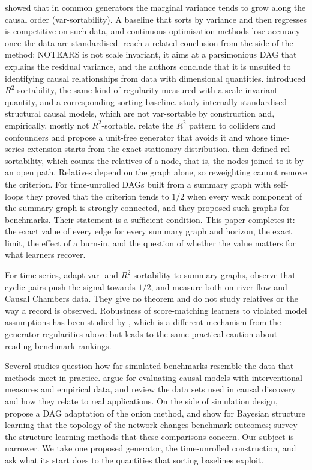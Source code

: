 \documentclass[pdflatex,sn-apa]{sn-jnl}
\theoremstyle{thmstyleone}
\theoremstyle{thmstylethree}
\theoremstyle{thmstyletwo}
\begin{document}
\citet{reisach2021beware} showed that in common generators the marginal
variance tends to grow along the causal order (var-sortability). A baseline that
sorts by variance and then regresses is competitive on such data, and
continuous-optimisation methods lose accuracy once the data are standardised.
\citet{kaiser2022unsuitability} reach a related conclusion from the side of the
method: NOTEARS is not scale invariant, it aims at a parsimonious DAG that
explains the residual variance, and the authors conclude that it is unsuited to
identifying causal relationships from data with dimensional quantities.
\citet{reisach2023scale} introduced $R^2$-sortability, the same kind of
regularity measured with a scale-invariant quantity, and a corresponding
sorting baseline. \citet{ormaniec2025standardizing} study internally
standardised structural causal models, which are not var-sortable by
construction and, empirically, mostly not $R^2$-sortable.
\citet{herman2025unitless} relate the $R^2$ pattern to colliders and
confounders and propose a unit-free generator that avoids it and whose
time-series extension starts from the exact stationary distribution.
\citet{reisach2026topological} then defined rel-sortability, which counts the
relatives of a node, that is, the nodes joined to it by an open path. Relatives
depend on the graph alone, so reweighting cannot remove the criterion. For
time-unrolled DAGs built from a summary graph with self-loops they proved that
the criterion tends to $1/2$ when every weak component of the summary graph is
strongly connected, and they proposed such graphs for benchmarks. Their
statement is a sufficient condition. This paper completes it: the exact value of
every edge for every summary graph and horizon, the exact limit, the effect of a
burn-in, and the question of whether the value matters for what learners
recover.

For time series, \citet{lohse2025sortability} adapt var- and $R^2$-sortability
to summary graphs, observe that cyclic pairs push the signal towards $1/2$,
and measure both on river-flow and Causal Chambers data. They give no theorem
and do not study relatives or the way a record is observed. Robustness of
score-matching learners to violated model assumptions has been studied by
\citet{montagna2023assumption}, which is a different mechanism from the
generator regularities above but leads to the same practical caution about
reading benchmark rankings.

Several studies question how far simulated benchmarks resemble the data that
methods meet in practice. \citet{gentzel2019case} argue for evaluating causal
models with interventional measures and empirical data, and
\citet{brouillard2025landscape} review the data sets used in causal discovery
and how they relate to real applications. On the side of simulation design,
\citet{andrews2026daggeneration} propose a DAG adaptation of the onion method,
and \citet{nagarajan2025topology} show for Bayesian structure learning that the
topology of the network changes benchmark outcomes; \citet{vowels2022dya}
survey the structure-learning methods that these comparisons concern. Our
subject is narrower. We take one proposed generator, the time-unrolled
construction, and ask what its start does to the quantities that sorting
baselines exploit.
\end{document}
